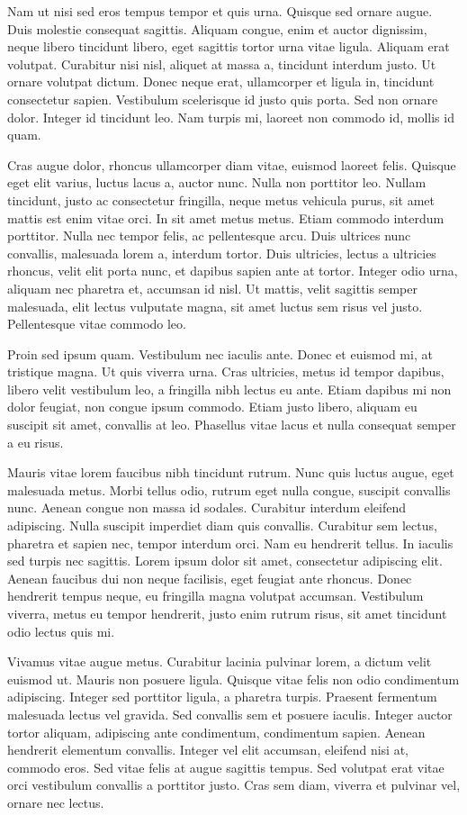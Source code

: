 \documentclass[twoside]{article}
\begin{document}
Nam ut nisi sed eros tempus tempor et quis urna. Quisque sed ornare augue. Duis molestie consequat sagittis. Aliquam congue, enim et auctor dignissim, neque libero tincidunt libero, eget sagittis tortor urna vitae ligula. Aliquam erat volutpat. Curabitur nisi nisl, aliquet at massa a, tincidunt interdum justo. Ut ornare volutpat dictum. Donec neque erat, ullamcorper et ligula in, tincidunt consectetur sapien. Vestibulum scelerisque id justo quis porta. Sed non ornare dolor. Integer id tincidunt leo. Nam turpis mi, laoreet non commodo id, mollis id quam.

Cras augue dolor, rhoncus ullamcorper diam vitae, euismod laoreet felis. Quisque eget elit varius, luctus lacus a, auctor nunc. Nulla non porttitor leo. Nullam tincidunt, justo ac consectetur fringilla, neque metus vehicula purus, sit amet mattis est enim vitae orci. In sit amet metus metus. Etiam commodo interdum porttitor. Nulla nec tempor felis, ac pellentesque arcu. Duis ultrices nunc convallis, malesuada lorem a, interdum tortor. Duis ultricies, lectus a ultricies rhoncus, velit elit porta nunc, et dapibus sapien ante at tortor. Integer odio urna, aliquam nec pharetra et, accumsan id nisl. Ut mattis, velit sagittis semper malesuada, elit lectus vulputate magna, sit amet luctus sem risus vel justo. Pellentesque vitae commodo leo.

Proin sed ipsum quam. Vestibulum nec iaculis ante. Donec et euismod mi, at tristique magna. Ut quis viverra urna. Cras ultricies, metus id tempor dapibus, libero velit vestibulum leo, a fringilla nibh lectus eu ante. Etiam dapibus mi non dolor feugiat, non congue ipsum commodo. Etiam justo libero, aliquam eu suscipit sit amet, convallis at leo. Phasellus vitae lacus et nulla consequat semper a eu risus.

Mauris vitae lorem faucibus nibh tincidunt rutrum. Nunc quis luctus augue, eget malesuada metus. Morbi tellus odio, rutrum eget nulla congue, suscipit convallis nunc. Aenean congue non massa id sodales. Curabitur interdum eleifend adipiscing. Nulla suscipit imperdiet diam quis convallis. Curabitur sem lectus, pharetra et sapien nec, tempor interdum orci. Nam eu hendrerit tellus. In iaculis sed turpis nec sagittis. Lorem ipsum dolor sit amet, consectetur adipiscing elit. Aenean faucibus dui non neque facilisis, eget feugiat ante rhoncus. Donec hendrerit tempus neque, eu fringilla magna volutpat accumsan. Vestibulum viverra, metus eu tempor hendrerit, justo enim rutrum risus, sit amet tincidunt odio lectus quis mi.

Vivamus vitae augue metus. Curabitur lacinia pulvinar lorem, a dictum velit euismod ut. Mauris non posuere ligula. Quisque vitae felis non odio condimentum adipiscing. Integer sed porttitor ligula, a pharetra turpis. Praesent fermentum malesuada lectus vel gravida. Sed convallis sem et posuere iaculis. Integer auctor tortor aliquam, adipiscing ante condimentum, condimentum sapien. Aenean hendrerit elementum convallis. Integer vel elit accumsan, eleifend nisi at, commodo eros. Sed vitae felis at augue sagittis tempus. Sed volutpat erat vitae orci vestibulum convallis a porttitor justo. Cras sem diam, viverra et pulvinar vel, ornare nec lectus.
\end{document}
